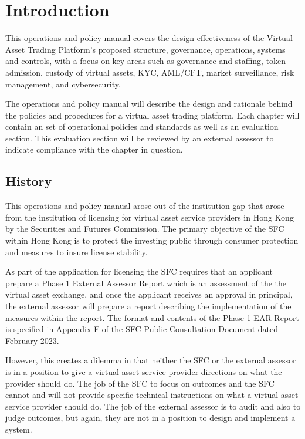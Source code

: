 \chapter{Introduction}

This operations and policy manual covers the design effectiveness of
the Virtual Asset Trading Platform's proposed structure, governance,
operations, systems and controls, with a focus on key areas such as
governance and staffing, token admission, custody of virtual assets,
KYC, AML/CFT, market surveillance, risk management, and cybersecurity.

The operations and policy manual will describe the design and
rationale behind the policies and procedures for a virtual asset
trading platform.  Each chapter will contain an set of operational
policies and standards as well as an evaluation section.  This
evaluation section will be reviewed by an external assessor to
indicate compliance with the chapter in question.

\section{History}

This operations and policy manual arose out of the institution gap
that arose from the institution of licensing for virtual asset service
providers in Hong Kong by the Securities and Futures Commission.  The
primary objective of the SFC within Hong Kong is to protect the
investing public through consumer protection and measures to insure
license stability.

As part of the application for licensing the SFC requires that an
applicant prepare a Phase 1 External Assessor Report which is an
assessment of the the virtual asset exchange, and once the applicant
receives an approval in principal, the external assessor will prepare
a report describing the implementation of the measures within the
report.  The format and contents of the Phase 1 EAR Report is
specified in Appendix F of the SFC Public Consultation Document dated
February 2023.

However, this creates a dilemma in that neither the SFC or the
external assessor is in a position to give a virtual asset service
provider directions on what the provider should do.  The job of the
SFC to focus on outcomes and the SFC cannot and will not provide
specific technical instructions on what a virtual asset service
provider should do.  The job of the external assessor is to audit and
also to judge outcomes, but again, they are not in a position to
design and implement a system.

